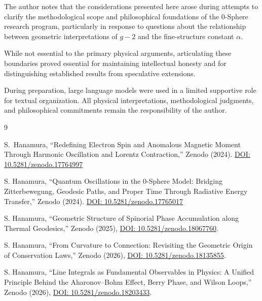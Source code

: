 \documentclass[12pt,letterpaper]{article}
\begin{document}
The author notes that the considerations presented here arose during attempts to clarify the methodological scope and philosophical foundations of the 0-Sphere research program, particularly in response to questions about the relationship between geometric interpretations of $g-2$ and the fine-structure constant $\alpha$.

While not essential to the primary physical arguments, articulating these boundaries proved essential for maintaining intellectual honesty and for distinguishing established results from speculative extensions.

During preparation, large language models were used in a limited supportive role for textual organization. All physical interpretations, methodological judgments, and philosophical commitments remain the responsibility of the author.



\begin{thebibliography}{9}

S.~Hanamura,
``Redefining Electron Spin and Anomalous Magnetic Moment Through Harmonic Oscillation and Lorentz Contraction,''
Zenodo (2024).
\href{https://doi.org/10.5281/zenodo.17764997}{DOI: 10.5281/zenodo.17764997}

S. Hanamura, ``Quantum Oscillations in the 0-Sphere Model: Bridging Zitterbewegung, Geodesic Paths, and Proper Time Through Radiative Energy Transfer,'' Zenodo (2024). \href{https://doi.org/10.5281/zenodo.17765017}{DOI: 10.5281/zenodo.17765017}

S. Hanamura, ``Geometric Structure of Spinorial Phase Accumulation along Thermal Geodesics,'' Zenodo (2025), \href{https://doi.org/10.5281/zenodo.18067760}{DOI: 10.5281/zenodo.18067760}.

S. Hanamura, ``From Curvature to Connection: Revisiting the Geometric Origin of Conservation Laws,'' Zenodo (2026), \href{https://doi.org/10.5281/zenodo.18135855}{DOI: 10.5281/zenodo.18135855}.

S. Hanamura, ``Line Integrals as Fundamental Observables in Physics: A Unified Principle Behind the Aharonov--Bohm Effect, Berry Phase, and Wilson Loops,'' Zenodo (2026), \href{https://doi.org/10.5281/zenodo.18203433}{DOI: 10.5281/zenodo.18203433}.

\end{thebibliography}
\end{document}
